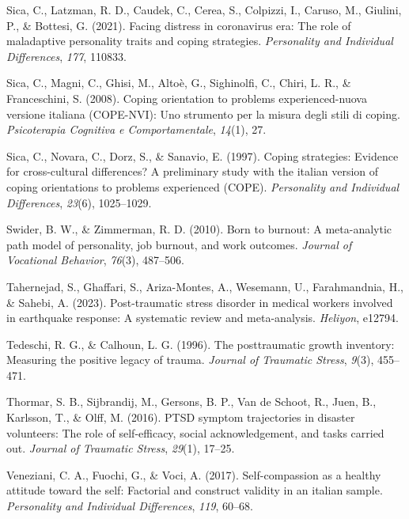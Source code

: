 \documentclass[
  man,floatsintext]{apa7}
\newlength{\cslhangindent}
\newlength{\cslentryspacingunit} %
\newenvironment{CSLReferences}[2] %
 {%
  \setlength{\parindent}{0pt}
  \ifodd #1
  \let\oldpar\par
  \def\par{\hangindent=\cslhangindent\oldpar}
  \fi
  \setlength{\parskip}{#2\cslentryspacingunit}
 }%
 {}
\begin{document}
\begin{CSLReferences}{1}{0}
\leavevmode{}%
Sica, C., Latzman, R. D., Caudek, C., Cerea, S., Colpizzi, I., Caruso, M., Giulini, P., \& Bottesi, G. (2021). Facing distress in coronavirus era: The role of maladaptive personality traits and coping strategies. \emph{Personality and Individual Differences}, \emph{177}, 110833.

\leavevmode{}%
Sica, C., Magni, C., Ghisi, M., Altoè, G., Sighinolfi, C., Chiri, L. R., \& Franceschini, S. (2008). Coping orientation to problems experienced-nuova versione italiana (COPE-NVI): Uno strumento per la misura degli stili di coping. \emph{Psicoterapia Cognitiva e Comportamentale}, \emph{14}(1), 27.

\leavevmode{}%
Sica, C., Novara, C., Dorz, S., \& Sanavio, E. (1997). Coping strategies: Evidence for cross-cultural differences? A preliminary study with the italian version of coping orientations to problems experienced (COPE). \emph{Personality and Individual Differences}, \emph{23}(6), 1025--1029.

\leavevmode{}%
Swider, B. W., \& Zimmerman, R. D. (2010). Born to burnout: A meta-analytic path model of personality, job burnout, and work outcomes. \emph{Journal of Vocational Behavior}, \emph{76}(3), 487--506.

\leavevmode{}%
Tahernejad, S., Ghaffari, S., Ariza-Montes, A., Wesemann, U., Farahmandnia, H., \& Sahebi, A. (2023). Post-traumatic stress disorder in medical workers involved in earthquake response: A systematic review and meta-analysis. \emph{Heliyon}, e12794.

\leavevmode{}%
Tedeschi, R. G., \& Calhoun, L. G. (1996). The posttraumatic growth inventory: Measuring the positive legacy of trauma. \emph{Journal of Traumatic Stress}, \emph{9}(3), 455--471.

\leavevmode{}%
Thormar, S. B., Sijbrandij, M., Gersons, B. P., Van de Schoot, R., Juen, B., Karlsson, T., \& Olff, M. (2016). PTSD symptom trajectories in disaster volunteers: The role of self-efficacy, social acknowledgement, and tasks carried out. \emph{Journal of Traumatic Stress}, \emph{29}(1), 17--25.

\leavevmode{}%
Veneziani, C. A., Fuochi, G., \& Voci, A. (2017). Self-compassion as a healthy attitude toward the self: Factorial and construct validity in an italian sample. \emph{Personality and Individual Differences}, \emph{119}, 60--68.


\end{CSLReferences}
\end{document}
